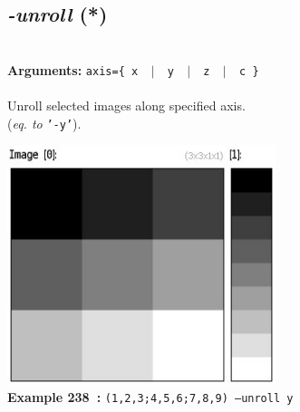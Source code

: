 \documentclass[a4paper,11pt,twoside]{book}
\begin{document}
\subsection{\emph{-unroll} (*)}\vspace*{-0.5em}
~\\\textbf{Arguments: } 
{\small \texttt{axis=\{ x ~$|$~ y ~$|$~ z ~$|$~ c \}}}\\~\\
Unroll selected images along specified axis.
~\\(\emph{eq. to} {\small \texttt{'-y'}}).
\begin{center}\includegraphics[keepaspectratio=true,height=7cm,width=\textwidth]{img/gmic_def238.jpg}\\
{\footnotesize \textbf{Example 238~:} \texttt{(1,2,3;4,5,6;7,8,9) --unroll y}}
\end{center}
\end{document}
